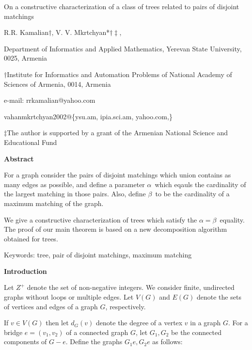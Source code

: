 \documentclass{article}
\begin{document}
\begin{center}
{\Large On a constructive characterization of a class of trees related to
pairs of disjoint matchings}

R.R. Kamalian$\dagger $, V. V. Mkrtchyan*$\dagger \ddagger $,

{\small *Department of Informatics and Applied Mathematics, Yerevan State
University, 0025, Armenia}

$\dagger ${\small Institute for Informatics and Automation Problems of
National Academy of Sciences of Armenia, 0014, Armenia}

{\small e-mail: rrkamalian@yahoo.com}

{\small vahanmkrtchyan2002@\{ysu.am, ipia.sci.am, yahoo.com,\}}

$\ddagger ${\small The author is supported by a grant of the Armenian
National Science and Educational Fund}
\end{center}

\bigskip

\begin{center}
\textbf{Abstract}
\end{center}

{\small For a graph consider the pairs of disjoint matchings which union
contains as many edges as possible, and define a parameter }$\alpha ${\small \ which eqauls the cardinality of the largest matching in those pairs. Also,
define }$\beta ${\small \ to be the cardinality of a maximum matching of the
graph.}

{\small We give a constructive characterization of trees which satisfy the }$\alpha =\beta ${\small \ equality. The proof of our main theorem is based on
a new decomposition algorithm obtained for trees.}

{\small Keywords: tree, pair of disjoint matchings, maximum matching}

\bigskip

\begin{center}
\textbf{Introduction}\bigskip
\end{center}

Let $Z^{+}$ denote the set of non-negative integers. We consider finite,
undirected graphs without loops or multiple edges. Let $V(G)$ and $E(G)$
denote the sets of vertices and edges of a graph $G$, respectively.

If $v\in V(G)$ then let $d_{G}(v)$ denote the degree of a vertex $v$ in a
graph $G$. For a bridge $e=(v_{1},v_{2})$ of a connected graph $G$, let $G_{1},G_{2}$ be the connected components of $G-e$. Define the graphs $G_{1}e,G_{2}e$ as follows:
\end{document}
